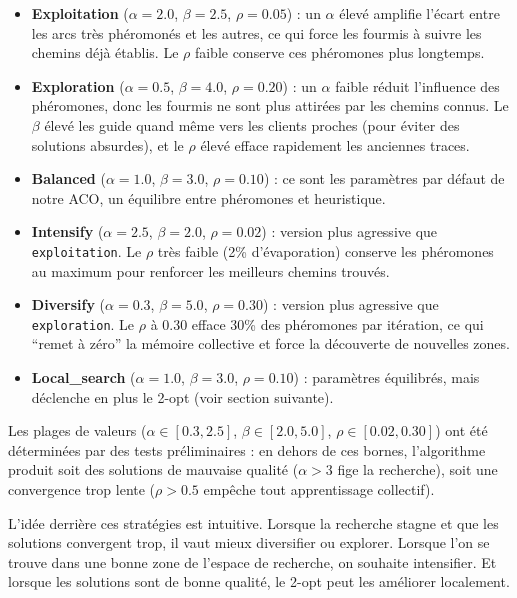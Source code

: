 \documentclass[12pt, a4paper]{article}
\begin{document}
\begin{itemize}
    \item \textbf{Exploitation} ($\alpha=2.0$, $\beta=2.5$, $\rho=0.05$) : un $\alpha$ élevé amplifie l'écart entre les arcs très phéromonés et les autres, ce qui force les fourmis à suivre les chemins déjà établis. Le $\rho$ faible conserve ces phéromones plus longtemps.
    \item \textbf{Exploration} ($\alpha=0.5$, $\beta=4.0$, $\rho=0.20$) : un $\alpha$ faible réduit l'influence des phéromones, donc les fourmis ne sont plus attirées par les chemins connus. Le $\beta$ élevé les guide quand même vers les clients proches (pour éviter des solutions absurdes), et le $\rho$ élevé efface rapidement les anciennes traces.
    \item \textbf{Balanced} ($\alpha=1.0$, $\beta=3.0$, $\rho=0.10$) : ce sont les paramètres par défaut de notre ACO, un équilibre entre phéromones et heuristique.
    \item \textbf{Intensify} ($\alpha=2.5$, $\beta=2.0$, $\rho=0.02$) : version plus agressive que \texttt{exploitation}. Le $\rho$ très faible (2\% d'évaporation) conserve les phéromones au maximum pour renforcer les meilleurs chemins trouvés.
    \item \textbf{Diversify} ($\alpha=0.3$, $\beta=5.0$, $\rho=0.30$) : version plus agressive que \texttt{exploration}. Le $\rho$ à 0.30 efface 30\% des phéromones par itération, ce qui ``remet à zéro'' la mémoire collective et force la découverte de nouvelles zones.
    \item \textbf{Local\_search} ($\alpha=1.0$, $\beta=3.0$, $\rho=0.10$) : paramètres équilibrés, mais déclenche en plus le 2-opt (voir section suivante).
\end{itemize}

Les plages de valeurs ($\alpha \in [0.3, 2.5]$, $\beta \in [2.0, 5.0]$, $\rho \in [0.02, 0.30]$) ont été déterminées par des tests préliminaires : en dehors de ces bornes, l'algorithme produit soit des solutions de mauvaise qualité ($\alpha > 3$ fige la recherche), soit une convergence trop lente ($\rho > 0.5$ empêche tout apprentissage collectif).

L'idée derrière ces stratégies est intuitive. Lorsque la recherche stagne et que les solutions convergent trop, il vaut mieux diversifier ou explorer. Lorsque l'on se trouve dans une bonne zone de l'espace de recherche, on souhaite intensifier. Et lorsque les solutions sont de bonne qualité, le 2-opt peut les améliorer localement.
\end{document}
